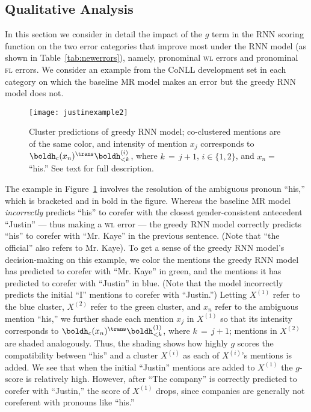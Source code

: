 \documentclass[11pt,letterpaper]{article}
\newcommand{\niceq}{\ensuremath{\,{=}\,}}
\begin{document}
\subsection{Qualitative Analysis}
In this section we consider in detail the impact of the $g$ term in the RNN scoring function on the two error categories that improve most under the RNN model (as shown in Table~\ref{tab:newerrors}), namely, pronominal \textsc{wl} errors and pronominal \textsc{fl} errors. We consider an example from the CoNLL development set in each category on which the baseline MR model makes an error but the greedy RNN model does not.

\begin{figure}[t!]
\centering
\texttt{[image: justinexample2]}
\caption{Cluster predictions of greedy RNN model; co-clustered mentions are of the same color, and intensity of mention $x_j$ corresponds to $\boldh_c(x_n)^{\trans} \boldh_{<k}^{(i)}$, where $k \niceq j+1$, $i \in \{1,2\}$, and $x_n =$ ``his.'' See text for full description.}
\label{fig:wlviz}
\end{figure}

The example in Figure~\ref{fig:wlviz} involves the resolution of the ambiguous pronoun ``his,'' which is bracketed and in bold in the figure. Whereas the baseline MR model \textit{incorrectly} predicts ``his'' to corefer with the closest gender-consistent antecedent ``Justin'' --- thus making a \textsc{wl} error --- the greedy RNN model correctly predicts ``his'' to corefer with ``Mr. Kaye'' in the previous sentence. (Note that ``the official'' also refers to Mr. Kaye). To get a sense of the greedy RNN model's decision-making on this example, we color the mentions the greedy RNN model has predicted to corefer with ``Mr. Kaye'' in green, and the mentions it has predicted to corefer with ``Justin'' in blue. (Note that the model incorrectly predicts the initial ``I'' mentions to corefer with ``Justin.'') Letting $X^{(1)}$ refer to the blue cluster, $X^{(2)}$ refer to the green cluster, and $x_n$ refer to the ambiguous mention ``his,'' we further shade each mention $x_j$ in $X^{(1)}$ so that its intensity corresponds to $\boldh_c(x_n)^{\trans} \boldh_{<k}^{(1)}$, where $k \niceq j+1$; mentions in $X^{(2)}$ are shaded analogously. Thus, the shading shows how highly $g$ scores the compatibility between ``his'' and a cluster $X^{(i)}$ as each of $X^{(i)}$'s mentions is added. We see that when the initial ``Justin'' mentions are added to $X^{(1)}$ the $g$-score is relatively high. However, after ``The company'' is correctly predicted to corefer with ``Justin,'' the score of $X^{(1)}$ drops, since companies are generally not coreferent with pronouns like ``his.''
\end{document}
